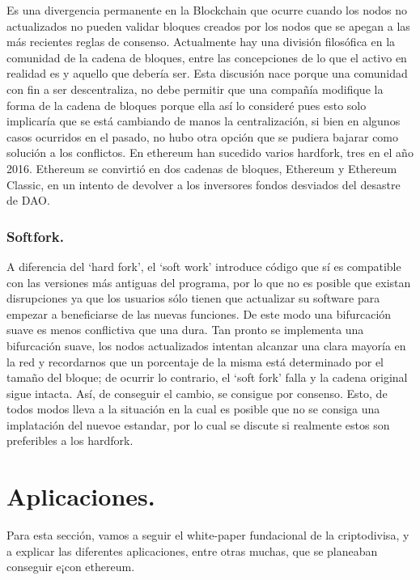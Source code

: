 \documentclass[11pt,a4paper]{article}
\begin{document}
\label{sec:hardfork}
Es una divergencia permanente en la Blockchain que ocurre cuando los nodos no actualizados no pueden validar bloques creados por los nodos que se apegan a las más recientes reglas de consenso. Actualmente hay una división filosófica en la comunidad  de la cadena de bloques, entre las concepciones de lo que el activo en realidad es y aquello que debería ser. Esta discusión nace porque una comunidad con fin a ser descentraliza, no debe permitir que una compañía modifique la forma de la cadena de bloques porque ella así lo consideré pues esto solo implicaría que se está cambiando de manos la centralización, si bien en algunos casos ocurridos en el pasado, no hubo otra opción que se pudiera bajarar como solución a los conflictos. En ethereum han sucedido varios hardfork, tres en el año 2016. Ethereum se convirtió en dos cadenas de bloques, Ethereum y Ethereum Classic, en un intento de devolver a los inversores fondos desviados del desastre de DAO.\\

\subsubsection{Softfork.}
A diferencia del ‘hard fork’, el ‘soft work’ introduce código que sí es compatible con las versiones más antiguas del programa, por lo que no es posible que existan disrupciones ya que los usuarios sólo tienen que actualizar su software para empezar a beneficiarse de las nuevas funciones. De este modo una bifurcación suave es menos conflictiva que una dura.  Tan pronto se implementa una bifurcación suave, los nodos actualizados intentan alcanzar una clara mayoría en la red y recordarnos que un porcentaje de la misma está determinado por el tamaño del bloque; de ocurrir lo contrario, el ‘soft fork’ falla y la cadena original sigue intacta. Así, de conseguir el cambio, se consigue por consenso. Esto, de todos modos lleva a la situación en la cual es posible que no se consiga una implatación del nuevoe estandar, por lo cual se discute si realmente estos son preferibles a los hardfork.

\section {Aplicaciones.} 
Para esta sección, vamos a seguir el white-paper fundacional de la criptodivisa, y a explicar las diferentes aplicaciones, entre otras muchas, que se planeaban conseguir e¡con ethereum.\\
\end{document}
